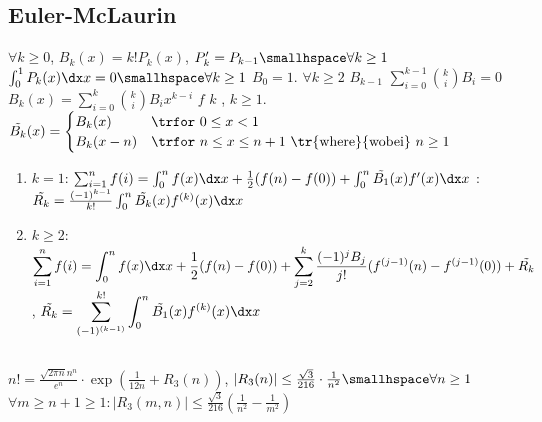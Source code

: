 \newsectionNoPB
\subsection{Euler-McLaurin }
\shortdef $\forall k \geq 0$,  $B_k(x) = k!P_k(x)$,  $P_k' = P_{k - 1} \smallhspace \forall k \geq 1$ \trand $\int_{0}^{1} P_k(x) \dx x = 0 \smallhspace\forall k \geq 1$
%
\shortdef \trLet $B_0 = 1$. $\forall k \geq 2$ $B_{k - 1}$  $\sum_{i = 0}^{k - 1} {k \choose i} B_i = 0$ 
%
 $B_k(x) = \sum_{i = 0}^{k} {k \choose i} B_i x^{k - i}$
%
 \shorttheorem $f$ $k$ , $k \geq 1$.  $\tilde{B_k}(x) = \begin{cases}
    B_k(x) & \text{\trfor } 0 \leq x < 1\\
    B_k(x - n ) & \text{\trfor } n \leq x \leq n + 1 \text{ \tr{where}{wobei} } n \geq 1
\end{cases}$ 
\vspace{-0.3pc}
\begin{enumerate}
    \item \trFor $k = 1$: $\sum_{i = 1}^{n} f(i) = \int_{0}^{n} f(x) \dx x + \frac{1}{2} (f(n) - f(0)) + \int_{0}^{n} \tilde{B_1}(x) f'(x) \dx x$ \mediumhspace
        : $\tilde{R_k} = \frac{(-1)^{k - 1}}{k!} \int_0^n \tilde{B_k}(x) f^{(k)}(x) \dx x$
    \item \trFor $k \geq 2$: $\displaystyle \sum_{i = 1}^{n} f(i) = \int_{0}^{n} f(x) \dx x + \frac{1}{2} (f(n) - f(0)) + \sum_{j = 2}^{k} \frac{(-1)^j B_j}{j!} (f^{(j - 1)}(n) - f^{(j - 1)}(0)) + \tilde{R_k}$,
          $\displaystyle \tilde{R_k} = \sum_{(-1)^{(k - 1)}}^{k!}\int_{0}^{n} \tilde{B_1}(x) f^{(k)}(x) \dx x$
\end{enumerate}
\vspace{-0.2pc}


\newsectionNoPB
\vspace{-0.5pc}
\subsection{}
\vspace{-0.2pc}
\shorttheorem $\displaystyle n! = \frac{\sqrt{2\pi n}n^n}{e^n} \cdot \exp \left( \frac{1}{12n} + R_3(n) \right)$, $|R_3(n)| \leq \frac{\sqrt{3}}{216}\cdot \frac{1}{n^2} \smallhspace \forall n \geq 1$
\shortlemma $\forall m \geq n + 1 \geq 1: |R_3(m,n)| \leq \frac{\sqrt{3}}{216} \left( \frac{1}{n^2} - \frac{1}{m^2} \right)$
\vspace{-0.2pc}


